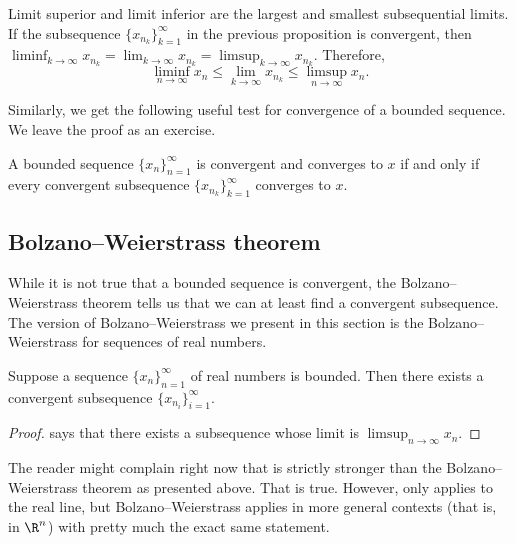 Limit superior and limit inferior
are the largest and smallest
subsequential limits.  If the subsequence $\{ x_{n_k} \}_{k=1}^\infty$ in the previous
proposition is convergent, then
$\liminf_{k\to\infty} x_{n_k} = \lim_{k\to\infty} x_{n_k} =
\limsup_{k\to\infty} x_{n_k}$.  Therefore,
\begin{equation*}
\liminf_{n\to\infty} x_n \leq
\lim_{k\to\infty} x_{n_k} \leq
\limsup_{n\to\infty} x_n .
\end{equation*}

Similarly, we get the following useful test for convergence
of a bounded sequence.  We leave the proof as an exercise.

\begin{prop} \label{seqconvsubseqconv:prop}
A bounded sequence $\{ x_n \}_{n=1}^\infty$ is convergent and converges to $x$
if and only if
every convergent subsequence
$\{ x_{n_k} \}_{k=1}^\infty$ converges to $x$.
\end{prop}

\subsection{Bolzano--Weierstrass theorem}

While it is not true that a bounded sequence is convergent, the
Bolzano--Weierstrass theorem tells us that we can at least find a convergent
subsequence.
The version of Bolzano--Weierstrass 
we present in this section is the Bolzano--Weierstrass for
sequences of real numbers.

\begin{thm}\label{thm:bwseq}
Suppose a sequence $\{ x_n \}_{n=1}^\infty$ of real numbers is bounded.
Then there exists a convergent subsequence $\{ x_{n_i} \}_{i=1}^\infty$.
\end{thm}

\begin{proof}
 says that there exists
a subsequence whose limit is $\limsup_{n\to\infty} x_n$.
\end{proof}

The reader might complain right now that 
 is strictly stronger than the
Bolzano--Weierstrass theorem as presented above.  That is true.
However, 
 only applies to the real line, but
Bolzano--Weierstrass applies in more general contexts (that is, in $\R^n$)
with pretty much the exact same statement.

